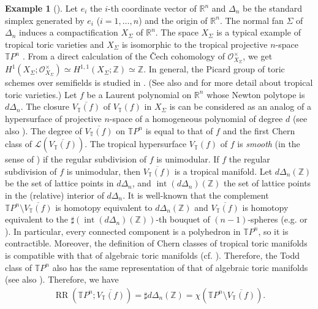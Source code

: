 \documentclass[a4paper,dvipdfmx,reqno,12pt]{amsart}
\theoremstyle{definition}
\newtheorem{example}[theorem]{Example}
\newcommand{\opn}[1]{\operatorname{#1}}
\numberwithin{equation}{section}
\begin{document}
\begin{example}[{\cite[Example 2.11]{demedrano2023chern}}]
\label{example-TPn}
Let $e_i$ the $i$-th coordinate vector of $\mathbb{R}^n$
and $\Delta_{n}$ be the standard simplex generated by
$e_i$ ($i=1,\ldots,n$) and the origin of $\mathbb{R}^n$.
The normal fan $\Sigma$ of $\Delta_{n}$ induces 
a compactification $X_{\Sigma}$ of $\mathbb{R}^n$.
The space $X_{\Sigma}$ is a typical example of
tropical toric varieties \cite{MR2428356,MR2511632}
and $X_{\Sigma}$ is
isomorphic to the tropical projective
$n$-space $\mathbb{T}P^{n}$ \cite[Example 3.10]{MR2275625}.
From a direct calculation of the \v{C}ech cohomology of
$\mathcal{O}_{X_{\Sigma}}^{\times}$, we get 
$H^{1}(X_{\Sigma};\mathcal{O}_{X_{\Sigma}}^{\times})
\simeq H^{1,1}(X_{\Sigma};\mathbb{Z})\simeq \mathbb{Z}$.
In general, the Picard group of toric 
schemes over semifields is studied in \cite{MR4016643}. 
(See also  and
\cite[Chapter 3]{mikhalkin2018tropical} for more detail
about tropical toric varieties.)
Let $f$ be a Laurent polynomial on $\mathbb{R}^{n}$
whose Newton polytope is $d\Delta_{n}$.
The closure $\overline{V_{\mathbb{T}}(f)}$ of 
$V_{\mathbb{T}}(f)$ in $X_{\Sigma}$
is can be considered
as an analog of a hypersurface of projective $n$-space of
a homogeneous polynomial of degree $d$
(see also \cite[Definition 3.4.6]{mikhalkin2018tropical}).
The degree of $\overline{V_{\mathbb{T}}(f)}$
on $\mathbb{T}P^n$ is equal to 
that of $f$ and the first Chern class 
of $\mathcal{L}(\overline{V_{\mathbb{T}}(f)})$.
The tropical hypersurface $V_{\mathbb{T}}(f)$ of $f$
is \emph{smooth} (in the sense of
\cite[]{MR3287221})
if the regular subdivision of $f$ is unimodular.
If $f$ the regular subdivision of $f$ is unimodular,
then $\overline{V_{\mathbb{T}}(f)}$ is a tropical manifold.
Let $d\Delta_n(\mathbb{Z})$ be the set of lattice points
in $d\Delta_n$, and 
$\opn{int}(d\Delta_n)(\mathbb{Z})$ the set of lattice points
in the (relative) interior of $d\Delta_n$.
It is well-known that the complement 
$\mathbb{T}P^{n}\setminus
\overline{V_{\mathbb{T}}(f)}$ is homotopy equivalent
to $d\Delta_n(\mathbb{Z})$ and 
$\overline{V_{\mathbb{T}}(f)}$ is homotopy equivalent
to the $\sharp (\opn{int}(d\Delta_n)(\mathbb{Z}))$-th
bouquet of $(n-1)$-spheres
(e.g. \cite[Proposition 3.1.6]{MR3287221}
or \cite[Proposition 3.4.12]{mikhalkin2018tropical}).
In particular, every connected component is a polyhedron in 
$\mathbb{T}P^{n}$, so it is contractible.
Moreover, the definition of Chern classes of
tropical toric manifolds is compatible with
that of algebraic toric manifolds
(cf. \cite[Proposition 13.1.2]{MR2810322}).
Therefore, the Todd class of $\mathbb{T}P^{n}$
also has the same representation of that of
algebraic toric manifolds
(see also \cite[Theorem 13.1.6]{MR2810322}). 
Therefore, we have
\begin{align}
\opn{RR}(\mathbb{T}P^{n};\overline{V_{\mathbb{T}}(f)})=
\sharp d\Delta_n(\mathbb{Z})=
\chi(\mathbb{T}P^{n}\setminus
\overline{V_{\mathbb{T}}(f)}).
\end{align}


\end{example}
\end{document}
